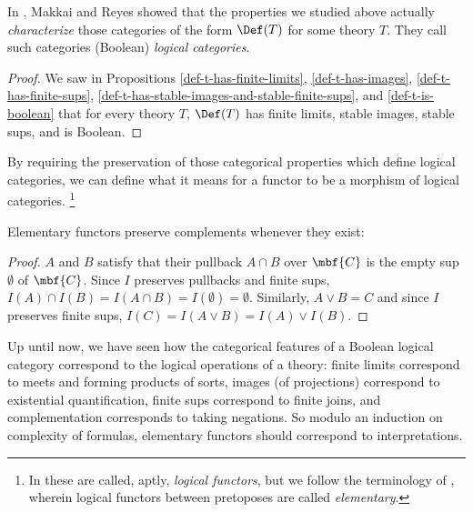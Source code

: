 \documentclass[11pt]{article}
\begin{document}
  In \cite{makkai-reyes}, Makkai and Reyes showed that the properties we studied above actually \emph{characterize} those categories of the form $\Def(T)$ for some theory $T$. They call such categories (Boolean) \emph{logical categories}.


\begin{proof}
We saw in Propositions \ref{def-t-has-finite-limits}, \ref{def-t-has-images}, \ref{def-t-has-finite-sups}, \ref{def-t-has-stable-images-and-stable-finite-sups}, and \ref{def-t-is-boolean} that for every theory $T$, $\Def(T)$ has finite limits, stable images, stable sups, and is Boolean.
\end{proof}

By requiring the preservation of those categorical properties which define logical categories, we can define what it means for a functor to be a morphism of logical categories. \footnote{In \cite{makkai-reyes} these are called, aptly, \emph{logical functors}, but we follow the terminology of \cite{makkai-sdfol}, wherein logical functors between pretoposes are called \emph{elementary}.}


Elementary functors preserve complements whenever they exist:


\begin{proof}
$A$ and $B$ satisfy that their pullback $A \cap B$ over $\mbf{C}$ is the empty sup $\emptyset$ of $\mbf{C}$. Since $I$ preserves pullbacks and finite sups, $I(A) \cap I(B) = I(A \cap B) = I(\emptyset) = \emptyset$. Similarly, $A \lor B = C$ and since $I$ preserves finite sups, $I(C) = I(A \lor B) = I(A) \lor I(B)$.
\end{proof}

Up until now, we have seen how the categorical features of a Boolean logical category correspond to the logical operations of a theory: finite limits correspond to meets and forming products of sorts, images (of projections) correspond to existential quantification, finite sups correspond to finite joins, and complementation corresponds to taking negations. So modulo an induction on complexity of formulas, elementary functors should correspond to interpretations.
\end{document}
